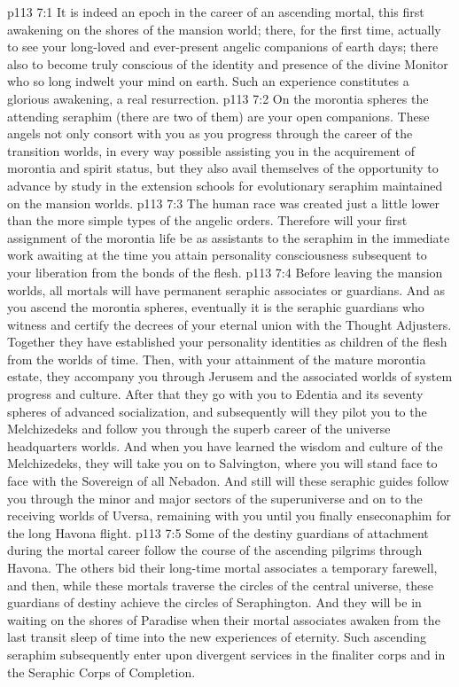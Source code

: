 \vs p113 7:1 It is indeed an epoch in the career of an ascending mortal, this first awakening on the shores of the mansion world; there, for the first time, actually to see your long\hyp{}loved and ever\hyp{}present angelic companions of earth days; there also to become truly conscious of the identity and presence of the divine Monitor who so long indwelt your mind on earth. Such an experience constitutes a glorious awakening, a real resurrection.
\vs p113 7:2 On the morontia spheres the attending seraphim (there are two of them) are your open companions. These angels not only consort with you as you progress through the career of the transition worlds, in every way possible assisting you in the acquirement of morontia and spirit status, but they also avail themselves of the opportunity to advance by study in the extension schools for evolutionary seraphim maintained on the mansion worlds.
\vs p113 7:3 The human race was created just a little lower than the more simple types of the angelic orders. Therefore will your first assignment of the morontia life be as assistants to the seraphim in the immediate work awaiting at the time you attain personality consciousness subsequent to your liberation from the bonds of the flesh.
\vs p113 7:4 Before leaving the mansion worlds, all mortals will have permanent seraphic associates or guardians. And as you ascend the morontia spheres, eventually it is the seraphic guardians who witness and certify the decrees of your eternal union with the Thought Adjusters. Together they have established your personality identities as children of the flesh from the worlds of time. Then, with your attainment of the mature morontia estate, they accompany you through Jerusem and the associated worlds of system progress and culture. After that they go with you to Edentia and its seventy spheres of advanced socialization, and subsequently will they pilot you to the Melchizedeks and follow you through the superb career of the universe headquarters worlds. And when you have learned the wisdom and culture of the Melchizedeks, they will take you on to Salvington, where you will stand face to face with the Sovereign of all Nebadon. And still will these seraphic guides follow you through the minor and major sectors of the superuniverse and on to the receiving worlds of Uversa, remaining with you until you finally enseconaphim for the long Havona flight.
\vs p113 7:5 Some of the destiny guardians of attachment during the mortal career follow the course of the ascending pilgrims through Havona. The others bid their long\hyp{}time mortal associates a temporary farewell, and then, while these mortals traverse the circles of the central universe, these guardians of destiny achieve the circles of Seraphington. And they will be in waiting on the shores of Paradise when their mortal associates awaken from the last transit sleep of time into the new experiences of eternity. Such ascending seraphim subsequently enter upon divergent services in the finaliter corps and in the Seraphic Corps of Completion.
